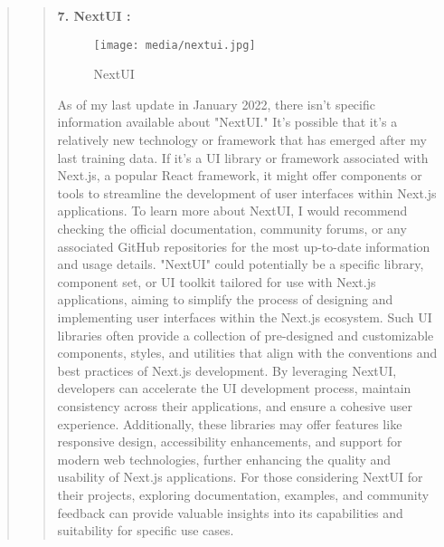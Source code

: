 \documentclass[12pt]{report}
\begin{document}
\begin{quote}
		
		\begin{quote}
			\textbf{7. NextUI :}\\
			\begin{figure}
				\centering
				\texttt{[image: media/nextui.jpg]}\\
				\caption{NextUI}
			\end{figure}
			As of my last update in January 2022, there isn't specific information available about "NextUI." It's possible that it's a relatively new technology or framework that has emerged after my last training data. If it's a UI library or framework associated with Next.js, a popular React framework, it might offer components or tools to streamline the development of user interfaces within Next.js applications. To learn more about NextUI, I would recommend checking the official documentation, community forums, or any associated GitHub repositories for the most up-to-date information and usage details. 
			"NextUI" could potentially be a specific library, component set, or UI toolkit tailored for use with Next.js applications, aiming to simplify the process of designing and implementing user interfaces within the Next.js ecosystem. Such UI libraries often provide a collection of pre-designed and customizable components, styles, and utilities that align with the conventions and best practices of Next.js development. By leveraging NextUI, developers can accelerate the UI development process, maintain consistency across their applications, and ensure a cohesive user experience. Additionally, these libraries may offer features like responsive design, accessibility enhancements, and support for modern web technologies, further enhancing the quality and usability of Next.js applications. For those considering NextUI for their projects, exploring documentation, examples, and community feedback can provide valuable insights into its capabilities and suitability for specific use cases.
		\end{quote}
		\clearpage
		

\end{quote}
\end{document}
